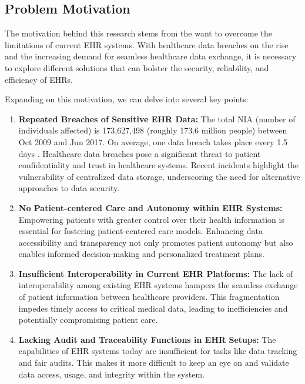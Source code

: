 \documentclass[12pt]{report}
\begin{document}
\subsection{Problem Motivation}
The motivation behind this research stems from the want to overcome the limitations of current EHR systems. With healthcare data breaches on the rise and the increasing demand for seamless healthcare data exchange, it is necessary to explore different solutions that can bolster the security, reliability, and efficiency of EHRs.

Expanding on this motivation, we can delve into several key points:

\begin{enumerate}
    \item \textbf{Repeated Breaches of Sensitive EHR Data:} The total NIA (number of individuals affected) is 173,627,498 (roughly 173.6 million people) between Oct 2009 and Jun 2017. On average, one data breach takes place every 1.5 days \cite{koczkodaj2019massive}. Healthcare data breaches pose a significant threat to patient confidentiality and trust in healthcare systems. Recent incidents highlight the vulnerability of centralized data storage, underscoring the need for alternative approaches to data security.
    
    \item \textbf{No Patient-centered Care and Autonomy within EHR Systems:} Empowering patients with greater control over their health information is essential for fostering patient-centered care models. Enhancing data accessibility and transparency not only promotes patient autonomy but also enables informed decision-making and personalized treatment plans.

    \item \textbf{Insufficient Interoperability in Current EHR Platforms:} The lack of interoperability among existing EHR systems hampers the seamless exchange of patient information between healthcare providers. This fragmentation impedes timely access to critical medical data, leading to inefficiencies and potentially compromising patient care.

    \item \textbf{Lacking Audit and Traceability Functions in EHR Setups:} The capabilities of EHR systems today are insufficient for tasks like data tracking and fair audits. This makes it more difficult to keep an eye on and validate data access, usage, and integrity within the system.  
\end{enumerate}
\end{document}
